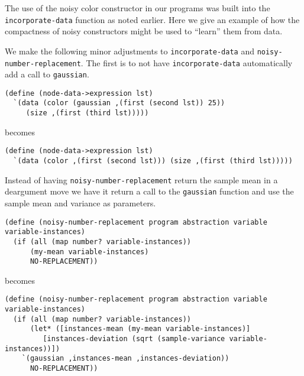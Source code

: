 \documentclass[a4paper,10pt]{article}
\begin{document}
The use of the noisy color constructor in our programs was built into the \texttt{incorporate-data} function as noted earlier.  Here we give an example of how the compactness of noisy constructors might be used to ``learn'' them from data.

We make the following minor adjustments to \texttt{incorporate-data} and \texttt{noisy-number-replacement}. The first is to not have \texttt{incorporate-data} automatically add a call to \texttt{gaussian}.
\begin{lstlisting}[frame=trBLsingle]
(define (node-data->expression lst)
  `(data (color (gaussian ,(first (second lst)) 25))
	 (size ,(first (third lst)))))
\end{lstlisting}
becomes
\begin{lstlisting}[frame=trBLsingle]
(define (node-data->expression lst)
  `(data (color ,(first (second lst))) (size ,(first (third lst)))))
\end{lstlisting}
Instead of having \texttt{noisy-number-replacement} return the sample mean in a deargument move we have it return a call to the \texttt{gaussian} function and use the sample mean and variance as parameters.
\begin{lstlisting}[frame=trBL]
(define (noisy-number-replacement program abstraction variable variable-instances)
  (if (all (map number? variable-instances))
      (my-mean variable-instances)
      NO-REPLACEMENT))
\end{lstlisting}
becomes
\begin{lstlisting}[frame=trBLsingle]
(define (noisy-number-replacement program abstraction variable variable-instances)
  (if (all (map number? variable-instances))
      (let* ([instances-mean (my-mean variable-instances)]
	     [instances-deviation (sqrt (sample-variance variable-instances))])
	`(gaussian ,instances-mean ,instances-deviation))
      NO-REPLACEMENT))
\end{lstlisting}
\end{document}

